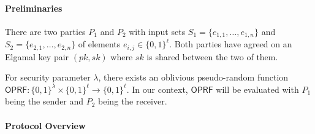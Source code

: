 \documentclass{article}
\newcommand{\oprf}[0]{\mathsf{OPRF}}
\begin{document}
\paragraph{Preliminaries} There are two parties $P_1$ and $P_2$ with
input sets $S_1=\{e_{1,1},\ldots,e_{1,n}\}$ and
$S_2=\{e_{2,1},\ldots,e_{2,n}\}$ of elements
$e_{i,j}\in\{0,1\}^\ell$. Both parties have agreed on an Elgamal key
pair $(pk,sk)$ where $sk$ is shared between the two of them.

For security parameter $\lambda$, there exists an oblivious
pseudo-random function
$\oprf:\{0,1\}^\lambda\times\{0,1\}^\ell\rightarrow{}\{0,1\}^\ell$.
In our context, $\oprf$ will be evaluated with $P_1$ being the sender
and $P_2$ being the receiver.

\paragraph{Protocol Overview}
\end{document}
